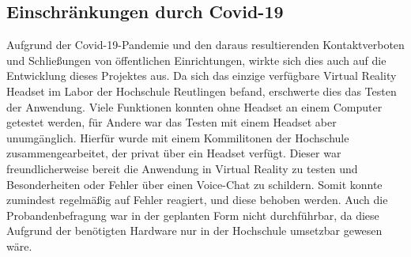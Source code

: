 \subsection{Einschränkungen durch Covid-19}
Aufgrund der Covid-19-Pandemie und den daraus resultierenden Kontaktverboten und Schließungen von öffentlichen Einrichtungen, wirkte sich dies auch auf die Entwicklung dieses Projektes aus. Da sich das einzige verfügbare Virtual Reality Headset im Labor der Hochschule Reutlingen befand, erschwerte dies das Testen der Anwendung. Viele Funktionen konnten ohne Headset an einem Computer getestet werden, für Andere war das Testen mit einem Headset aber unumgänglich. Hierfür wurde mit einem Kommilitonen der Hochschule zusammengearbeitet, der privat über ein Headset verfügt. Dieser war freundlicherweise bereit die Anwendung in Virtual Reality zu testen und Besonderheiten oder Fehler über einen Voice-Chat zu schildern. Somit konnte zumindest regelmäßig auf Fehler reagiert, und diese behoben werden. \newline
Auch die Probandenbefragung war in der geplanten Form nicht durchführbar, da diese Aufgrund der benötigten Hardware nur in der Hochschule umsetzbar gewesen wäre. 